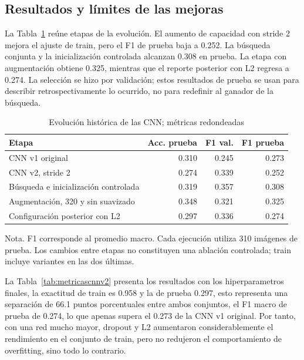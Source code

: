 \documentclass[conference]{IEEEtran}
\begin{document}
\subsection{Resultados y límites de las mejoras}

La Tabla~\ref{tab:evolucioncnn} reúne etapas de la evolución. El aumento de capacidad con stride 2 mejora el ajuste de train, pero el F1 de prueba baja a 0.252. La búsqueda conjunta y la inicialización controlada alcanzan 0.308 en prueba. La etapa con augmentación obtiene 0.325, mientras que el reporte posterior con L2 regresa a 0.274. La selección se hizo por validación; estos resultados de prueba se usan para describir retrospectivamente lo ocurrido, no para redefinir al ganador de la búsqueda.

\begin{table}[!htbp]
\caption{Evolución histórica de las CNN; métricas redondeadas}
\label{tab:evolucioncnn}
\centering
\scriptsize
\setlength{\tabcolsep}{3pt}
\begin{tabularx}{\columnwidth}{Xrrr}
\toprule
Etapa & Acc. prueba & F1 val. & F1 prueba \\
\midrule
CNN v1 original & 0.310 & 0.245 & 0.273 \\
CNN v2, stride 2 & 0.274 & 0.339 & 0.252 \\
Búsqueda e inicialización controlada & 0.319 & 0.357 & 0.308 \\
Augmentación, 320 y sin suavizado & 0.348 & 0.321 & 0.325 \\
Configuración posterior con L2 & 0.297 & 0.336 & 0.274 \\
\bottomrule
\end{tabularx}
\par\smallskip
\begin{minipage}{\columnwidth}\scriptsize
Nota. F1 corresponde al promedio macro. Cada ejecución utiliza 310 imágenes de prueba. Los cambios entre etapas no constituyen una ablación controlada; train incluye variantes en las dos últimas.
\end{minipage}
\end{table}

\vspace{3cm}

La Tabla~\ref{tab:metricascnnv2} presenta los resultados con los hiperparametros finales, la exactitud de train es 0.958 y la de prueba 0.297, esto representa una separación de 66.1 puntos porcentuales entre ambos conjuntos, el F1 macro de prueba de 0.274, lo que apenas supera el 0.273 de la CNN v1 original. Por tanto, con una red mucho mayor, dropout y L2 aumentaron considerablemente el rendimiento en el conjunto de train, pero no redujeron el comportamiento de overfitting, sino todo lo contrario.
\end{document}
